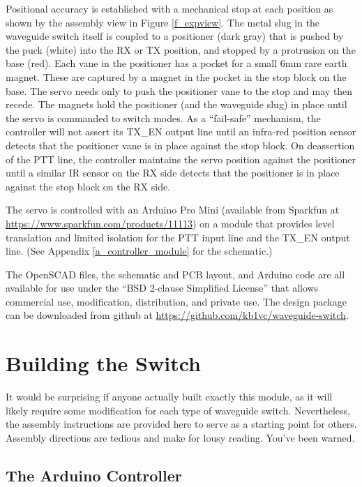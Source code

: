 \documentclass[12pt]{article}
\begin{document}
Positional accuracy is established with a mechanical stop at each
position as shown by the assembly view in Figure \ref{f_expview}. The
metal slug in the waveguide switch itself is coupled to a positioner
(dark gray) that is pushed by the puck (white) into the RX or TX
position, and stopped by a protrusion on the base (red). Each vane in
the positioner has a pocket for a small 6mm rare earth magnet. These
are captured by a magnet in the pocket in the stop block on the
base. The servo needs only to push the positioner vane to the stop and
may then recede. The magnets hold the positioner (and the waveguide
slug) in place until the servo is commanded to switch modes.  As a
``fail-safe'' mechanism, the controller will not assert its TX\_EN
output line until an infra-red position sensor detects that the
positioner vane is in place against the stop block.  On deassertion of
the PTT line, the controller maintains the servo position against the
positioner until a similar IR sensor on the RX side detects that the
positioner is in place against the stop block on the RX side.

The servo is controlled with an Arduino Pro Mini (available from
Sparkfun at \url{https://www.sparkfun.com/products/11113}) on a module
that provides level translation and limited isolation for the PTT
input line and the TX\_EN output line. (See Appendix \ref{a_controller_module}
for the schematic.)

The OpenSCAD files, the schematic and PCB layout, and Arduino code are
all available for use under the ``BSD 2-clause Simplified License'' that
allows commercial use, modification, distribution, and private use.
The design package can be downloaded from github at \url{https://github.com/kb1vc/waveguide-switch}.

\section{Building the Switch}

It would be surprising if anyone actually built exactly this module,
as it will likely require some modification for each type of waveguide
switch.  Nevertheless, the assembly instructions are provided here to
serve as a starting point for others. Assembly directions are tedious
and make for lousy reading.  You've been warned. 

\subsection{The Arduino Controller}
\end{document}
